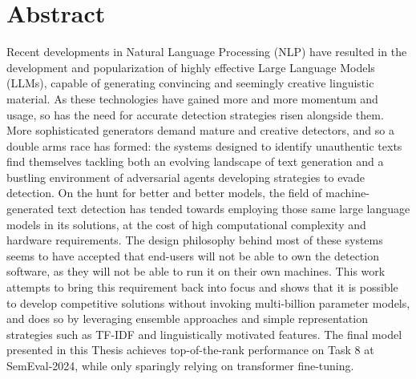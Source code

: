 \section*{Abstract}

Recent developments in Natural Language Processing (NLP) have resulted in the development and popularization of highly effective Large Language Models (LLMs), capable of generating convincing and seemingly creative linguistic material.
As these technologies have gained more and more momentum and usage, so has the need for accurate detection strategies risen alongside them.
More sophisticated generators demand mature and creative detectors, and so a double arms race has formed: the systems designed to identify unauthentic texts find themselves tackling both an evolving landscape of text generation and a bustling environment of adversarial agents developing strategies to evade detection.
On the hunt for better and better models, the field of machine-generated text detection has tended towards employing those same large language models in its solutions, at the cost of high computational complexity and hardware requirements.
The design philosophy behind most of these systems seems to have accepted that end-users will not be able to own the detection software, as they will not be able to run it on their own machines.
This work attempts to bring this requirement back into focus and shows that it is possible to develop competitive solutions without invoking multi-billion parameter models, and does so by leveraging ensemble approaches and simple representation strategies such as TF-IDF and linguistically motivated features.
The final model presented in this Thesis achieves top-of-the-rank performance on Task 8 at SemEval-2024, while only sparingly relying on transformer fine-tuning.